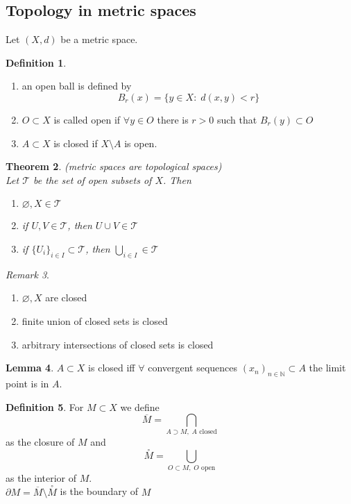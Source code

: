 \documentclass[a4paper, 12pt]{article}
\theoremstyle{plain}
\newtheorem{theorem}{Theorem}[subsection] %
\theoremstyle{definition}
\newtheorem{definition}[theorem]{Definition} %
\theoremstyle{lemma}
\newtheorem{lemma}[theorem]{Lemma}
\theoremstyle{remark}
\newtheorem{remark}[theorem]{Remark}
\theoremstyle{corollary}
\theoremstyle{example}
\begin{document}
	\subsection{Topology in metric spaces}
	Let $(X,d)$ be a metric space.
	\begin{definition}
		\begin{enumerate}
			\item an open ball is defined by \[B_r(x) = \{y \in X: \; d(x,y) < r\}\]
			\item $O \subset X$ is called open if $\forall y \in O$ there is $r > 0$ such that $B_r(y) \subset O$
			\item $A \subset X$ is closed if $X \setminus A$ is open.
		\end{enumerate}
	\end{definition}
	
	\begin{theorem} (metric spaces are topological spaces)\\
		Let $\mathcal{T}$ be the set of open subsets of $X$. Then \begin{enumerate}
			\item $\varnothing, X \in \mathcal{T}$
			\item if $U,V \in \mathcal{T}$, then $U \cup V \in \mathcal{T}$
			\item if $\{U_i\}_{i \in I} \subset \mathcal{T}$, then $\bigcup_{i \in I} \in \mathcal{T}$
		\end{enumerate}
	\end{theorem}
	
	\begin{remark}
		\begin{enumerate}
			\item $\varnothing, X$ are closed
			\item finite union of closed sets is closed
			\item arbitrary intersections of closed sets is closed
		\end{enumerate}
	\end{remark}
	
	\begin{lemma}
		$A \subset X$ is closed iff $\forall$ convergent sequences $(x_n)_{n \in \mathbb{N}} \subset A$ the limit point is in $A$.
	\end{lemma}
	
	\begin{definition}
		For $M \subset X$ we define \[\overline{M} = \bigcap\limits_{A \supset M, \; A \text{ closed}}\] as the closure of $M$ and \[\overset{°}{M} = \bigcup\limits_{O \subset M, \; O \text{ open}}\] as the interior of $M$.\\
		$\partial M = \overline{M} \setminus \overset{°}{M}$ is the boundary of $M$
	\end{definition}
	
\end{document}
